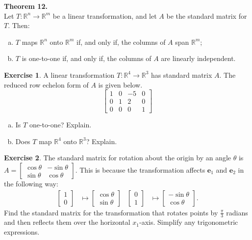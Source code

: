\documentclass[10pt]{book}
\newcommand{\boxcolor}{gray!30}
\newenvironment{boxthm}{\begin{mdframed}[backgroundcolor=\boxcolor,nobreak=true]}{\end{mdframed}}
\theoremstyle{definition}
\newtheorem{exercise}{Exercise}[section]
\newcommand{\R}{\mathbb{R}}
\newcommand{\vect}[1]{\ensuremath{\boldsymbol{\mathbf{#1}}}}
\newcommand{\ve}[1]{\vect{e}_{#1}}
\newcommand{\Tmap}[2]{T:\R^{#1}\to\R^{#2}}
\newcommand{\RotMat}[1][\theta]{\begin{bmatrix}\cos#1&-\sin#1\\ \sin#1&\cos#1\end{bmatrix}}
\begin{document}
\begin{boxthm}
	\textbf{Theorem 12.} \\
	Let $T:\R^n\to\R^m$ be a linear transformation, and let $A$ be the standard matrix for $T$. Then:
	\begin{enumerate}[(a)]
		\item $T$ maps $\R^n$ onto $\R^m$ if, and only if, the columns of $A$ span $\R^m$;
		\item $T$ is one-to-one if, and only if, the columns of $A$ are linearly independent.
	\end{enumerate}
\end{boxthm}

\begin{exercise} %
	A linear transformation $\Tmap{4}{3}$ has standard matrix $A$. The reduced row echelon form of $A$ is given below.
	$$\begin{bmatrix}1&0&-5&0\\0&1&2&0\\0&0&0&1\end{bmatrix}$$
	\begin{multicols}{2}
		\begin{enumerate}[(a)]
			\item Is $T$ one-to-one? Explain.
			\item Does $T$ map $\R^4$ onto $\R^3$? Explain.
		\end{enumerate}
	\end{multicols}
\end{exercise}
\vfill


\begin{exercise} %
	The standard matrix for rotation about the origin by an angle $\theta$ is $A=\RotMat$. This is because the transformation affects $\ve1$ and $\ve2$ in the following way:
	\begin{align*}
	\begin{bmatrix}1\\0\end{bmatrix} &\mapsto
	\begin{bmatrix} \cos\theta\\ \sin\theta \end{bmatrix} &
	\begin{bmatrix}0\\1\end{bmatrix} &\mapsto
	\begin{bmatrix} -\sin\theta\\ \cos\theta \end{bmatrix}.
	\end{align*}
	Find the standard matrix for the transformation that rotates points by $\frac{\pi}{3}$ radians and then reflects them over the horizontal $x_1$-axis. Simplify any trigonometric expressions.
\end{exercise}
\vfill
\end{document}
